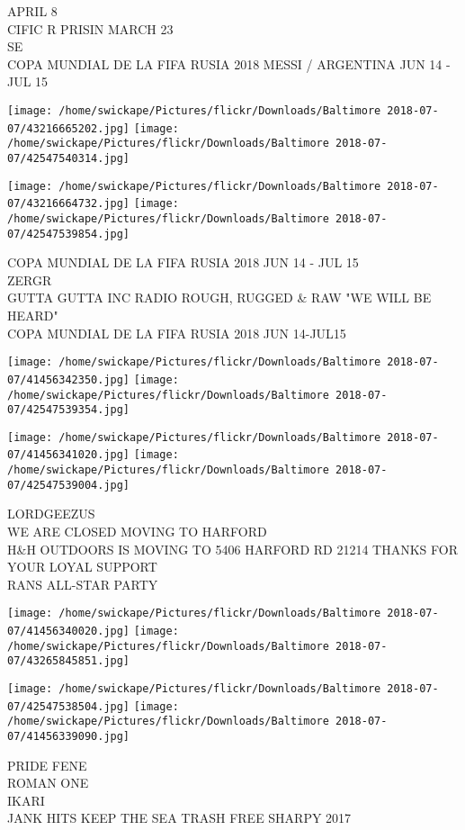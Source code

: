 \documentclass[10pt,letterpaper]{article}
\begin{document}
APRIL 8\\
CIFIC R PRISIN MARCH 23\\
SE\\
COPA MUNDIAL DE LA FIFA RUSIA 2018 MESSI / ARGENTINA JUN 14 {-} JUL 15
\pagebreak

\texttt{[image: /home/swickape/Pictures/flickr/Downloads/Baltimore 2018-07-07/43216665202.jpg]}
\texttt{[image: /home/swickape/Pictures/flickr/Downloads/Baltimore 2018-07-07/42547540314.jpg]}

\texttt{[image: /home/swickape/Pictures/flickr/Downloads/Baltimore 2018-07-07/43216664732.jpg]}
\texttt{[image: /home/swickape/Pictures/flickr/Downloads/Baltimore 2018-07-07/42547539854.jpg]}

COPA MUNDIAL DE LA FIFA RUSIA 2018 JUN 14 {-} JUL 15\\
ZERGR\\
GUTTA GUTTA INC RADIO ROUGH, RUGGED \& RAW "WE WILL BE HEARD"\\
COPA MUNDIAL DE LA FIFA RUSIA 2018 JUN 14{-}JUL15
\pagebreak

\texttt{[image: /home/swickape/Pictures/flickr/Downloads/Baltimore 2018-07-07/41456342350.jpg]}
\texttt{[image: /home/swickape/Pictures/flickr/Downloads/Baltimore 2018-07-07/42547539354.jpg]}

\texttt{[image: /home/swickape/Pictures/flickr/Downloads/Baltimore 2018-07-07/41456341020.jpg]}
\texttt{[image: /home/swickape/Pictures/flickr/Downloads/Baltimore 2018-07-07/42547539004.jpg]}

LORDGEEZUS\\
WE ARE CLOSED MOVING TO HARFORD\\
H\&H OUTDOORS IS MOVING TO 5406 HARFORD RD 21214 THANKS FOR YOUR LOYAL SUPPORT\\
RANS ALL{-}STAR PARTY
\pagebreak

\texttt{[image: /home/swickape/Pictures/flickr/Downloads/Baltimore 2018-07-07/41456340020.jpg]}
\texttt{[image: /home/swickape/Pictures/flickr/Downloads/Baltimore 2018-07-07/43265845851.jpg]}

\texttt{[image: /home/swickape/Pictures/flickr/Downloads/Baltimore 2018-07-07/42547538504.jpg]}
\texttt{[image: /home/swickape/Pictures/flickr/Downloads/Baltimore 2018-07-07/41456339090.jpg]}

PRIDE FENE\\
ROMAN ONE\\
IKARI\\
JANK HITS KEEP THE SEA TRASH FREE SHARPY 2017
\pagebreak
\end{document}
